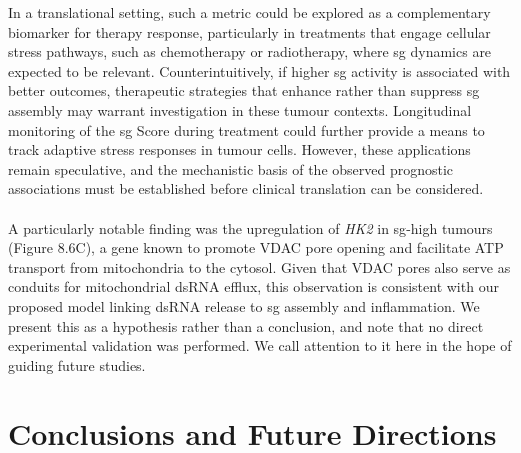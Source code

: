 In a translational setting, such a metric could be explored as a complementary biomarker for therapy response, particularly in treatments that engage cellular stress pathways, such as chemotherapy or radiotherapy, where \gls{sg} dynamics are expected to be relevant\cite{szaflarski_vinca_2016}. Counterintuitively, if higher \gls{sg} activity is associated with better outcomes, therapeutic strategies that enhance rather than suppress \gls{sg} assembly may warrant investigation in these tumour contexts. Longitudinal monitoring of the \gls{sg} Score during treatment could further provide a means to track adaptive stress responses in tumour cells. However, these applications remain speculative, and the mechanistic basis of the observed prognostic associations must be established before clinical translation can be considered.
\\
\\
A particularly notable finding was the upregulation of \textit{HK2} in \gls{sg}-high tumours (Figure 8.6C), a gene known to promote VDAC pore opening and facilitate ATP transport from mitochondria to the cytosol\cite{haloi_structural_2021}. Given that VDAC pores also serve as conduits for mitochondrial dsRNA efflux\cite{krieger_trafficking_2024}, this observation is consistent with our proposed model linking dsRNA release to \gls{sg} assembly and inflammation. We present this as a hypothesis rather than a conclusion, and note that no direct experimental validation was performed. We call attention to it here in the hope of guiding future studies.

\section{Conclusions and Future Directions}

